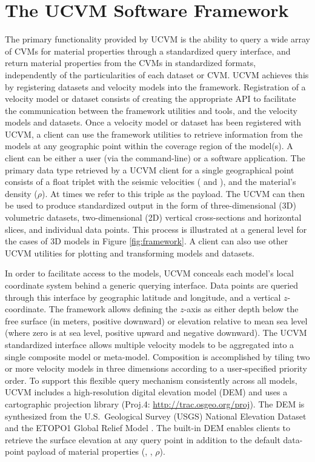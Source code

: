 






\section{The UCVM Software Framework}\label{sec:ucvm}

The primary functionality provided by UCVM is the ability to query a wide array of CVMs for material properties through a standardized query interface, and return material properties from the CVMs in standardized formats, independently of the particularities of each dataset or CVM. UCVM achieves this by registering datasets and velocity models into the framework. Registration of a velocity model or dataset consists of creating the appropriate API to facilitate the communication between the framework utilities and tools, and the velocity models and datasets. Once a velocity model or dataset has been registered with UCVM, a client can use the framework utilities to retrieve information from the models at any geographic point within the coverage region of the model(s). A client can be either a user (via the command-line) or a software application. The primary data type retrieved by a UCVM client for a single geographical point consists of a float triplet with the seismic velocities (\vp{} and \vs{}), and the material's density ($\rho$). At times we refer to this triple as the payload. The UCVM can then be used to produce standardized output in the form of three-dimensional (3D) volumetric datasets, two-dimensional (2D) vertical cross-sections and horizontal slices, and individual data points. This process is illustrated at a general level for the cases of 3D models in Figure \ref{fig:framework}. A client can also use other UCVM utilities for plotting and transforming models and datasets.

In order to facilitate access to the models, UCVM conceals each model's local coordinate system behind a generic querying interface. Data points are queried through this interface by geographic latitude and longitude, and a vertical $z$-coordinate. The framework allows defining the $z$-axis as either depth below the free surface (in meters, positive downward) or elevation relative to mean sea level (where zero is at sea level, positive upward and negative downward). The UCVM standardized interface allows multiple velocity models to be aggregated into a single composite model or meta-model. Composition is accomplished by tiling two or more velocity models in three dimensions according to a user-specified priority order. To support this flexible query mechanism consistently across all models, UCVM includes a high-resolution digital elevation model (DEM) and uses a cartographic projection library (Proj.4: \url{http://trac.osgeo.org/proj}). The DEM is synthesized from the U.S.~Geological Survey (USGS) National Elevation Dataset \citep{Gesch_2002_PERS, Gesch_2007_Chap} and the ETOPO1 Global Relief Model \citep{Amante_2009_Manual}. The built-in DEM enables clients to retrieve the surface elevation at any query point in addition to the default data-point payload of material properties (\vp{}, \vs{}, $\rho$).

